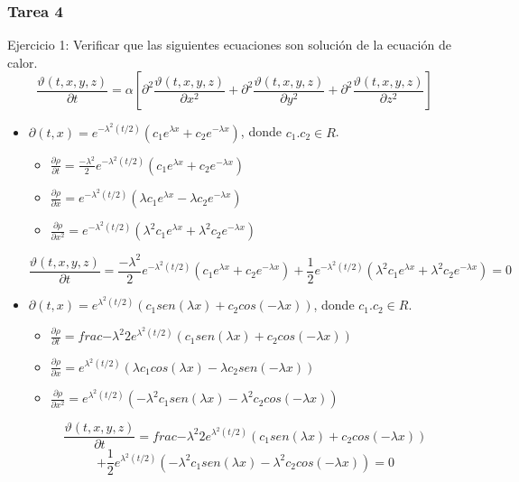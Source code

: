 \documentclass[11pt,fleqn]{book} %
\numberwithin{equation}{section} %
\numberwithin{figure}{section} %
\numberwithin{table}{section} %
\begin{document}
\subsubsection{Tarea 4}
Ejercicio 1: Verificar que las siguientes ecuaciones son solución de la ecuación de calor.
$$ \frac{\vartheta (t,x,y,z)}{\partial t}=\alpha \left [\partial^2 \frac{\vartheta (t,x,y,z)}{\partial x^2}+\partial^2 \frac{\vartheta (t,x,y,z)}{\partial y^2}+\partial^2 \frac{\vartheta (t,x,y,z)}{\partial z^2}  \right ] $$
\begin{itemize}
    \item $\partial (t,x) = e^{-\lambda^{2} (t/2)} (c_{1} e^{\lambda x} + c_{2} e^{-\lambda x} )$, donde $c_{1}.c_{2} \in R$.
    \begin{itemize}
        \item $\frac{\partial \rho}{\partial t} = \frac{-\lambda^{2}}{2} e^{-\lambda^{2} (t/2)} (c_{1} e^{\lambda x} + c_{2} e^{-\lambda x})$
        \item $\frac{\partial \rho}{\partial x} = e^{-\lambda^{2} (t/2)} (\lambda c_{1} e^{\lambda x} - \lambda c_{2} e^{-\lambda x} ) $
        \item $\frac{\partial \rho}{\partial x^{2}} = e^{-\lambda^{2} (t/2)} ( \lambda^{2} c_{1} e^{\lambda x} + \lambda^{2} c_{2} e^{-\lambda x} ) $
    \end{itemize}
    $$ \frac{\vartheta (t,x,y,z)}{\partial t} =  \frac{-\lambda^{2}}{2} e^{-\lambda^{2} (t/2)} (c_{1} e^{\lambda x} + c_{2} e^{-\lambda x}) + \frac{1}{2}  e^{-\lambda^{2} (t/2)} ( \lambda^{2} c_{1} e^{\lambda x} + \lambda^{2} c_{2} e^{-\lambda x} ) = 0   $$
    \item $\partial (t,x) = e^{\lambda^{2} (t/2)} (c_{1} sen(\lambda x) + c_{2} cos(-\lambda x) )$, donde $c_{1}.c_{2} \in R$.
    \begin{itemize}
        \item $\frac{\partial \rho}{\partial t} = frac{-\lambda^{2}}{2}  e^{\lambda^{2} (t/2)} (c_{1} sen(\lambda x) + c_{2} cos(-\lambda x) ) $
        \item $\frac{\partial \rho}{\partial x} = e^{\lambda^{2} (t/2)} ( \lambda c_{1} cos(\lambda x) - \lambda c_{2} sen(-\lambda x) ) $
        \item $\frac{\partial \rho}{\partial x^{2}} = e^{\lambda^{2} (t/2)} ( - \lambda^{2} c_{1} sen(\lambda x) - \lambda^{2} c_{2} cos(-\lambda x) ) $    
    \end{itemize}
    $$ \frac{\vartheta (t,x,y,z)}{\partial t} = frac{-\lambda^{2}}{2}  e^{\lambda^{2} (t/2)} (c_{1} sen(\lambda x) + c_{2} cos(-\lambda x) ) $$
    $$ + \frac{1}{2} e^{\lambda^{2} (t/2)} ( - \lambda^{2} c_{1} sen(\lambda x) - \lambda^{2} c_{2} cos(-\lambda x) ) = 0     $$
\end{itemize}
\end{document}
